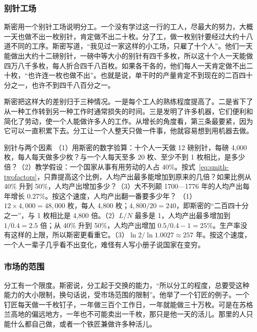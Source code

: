 \subsubsection{别针工场}
斯密用一个别针工场说明分工。一个没有学过这一行的工人，尽最大的努力，大概一天也做不出一枚别针，肯定做不出二十枚。分了工，做一枚别针要经过大约十八道不同的工序\cite{smith1776}。斯密写道，“我见过一家这样的小工场，只雇了十个人”。他们一天能做出大约十二磅别针，一磅中等大小的别针有四千多枚，所以这十个人一天能做四万八千多枚，每人折合四千八百枚。如果各干各的，他们每人一天肯定做不出二十枚，“也许连一枚也做不出”。也就是说，单干时的产量肯定不到现在的二百四十分之一，也许不到四千八百分之一\cite{smith1776}。

斯密把这样大的差别归于三种情况。一是每个工人的熟练程度提高了。二是省下了从一种工作转到另一种工作时通常损失的时间。三是发明了许多机器，它们便利和简化了劳动，使一个人能做许多人的工作\cite{smith1776}。从增长的角度看，第三条最要紧，因为它可以一直积累下去。分工让一个人整天只做一件事，他就容易想到用机器去做。

\begin{example}{别针与两个因素}\label{ex:smith-pins}
（1）用斯密的数字验算：十个人一天做 12 磅别针，每磅 4,000 枚，每人每天做多少枚？与一个人每天至多 20 枚、至少不到 1 枚相比，是多少倍？（2）教学假设：一个国家从事有用劳动的人占 40\%。按式~\eqref{eq:smith-twofactors}，只靠提高这个比例，人均产出最多能增加到原来的几倍？如果比例从 40\% 升到 50\%，人均产出增加多少？（3）大不列颠 1700—1776 年的人均产出每年增长 0.27\%。按这个速度，人均产出翻一番要多少年？
\solution （1）$12\times4{,}000=48{,}000$ 枚，每人 4,800 枚；$4{,}800/20=240$，即斯密的“二百四十分之一”，与 1 枚相比是 4,800 倍。（2）$L/N$ 最多是 1，人均产出最多增加到 $1/0.4=2.5$ 倍；从 40\% 升到 50\%，人均产出增加 $0.5/0.4-1=25\%$。生产率没有这样的上限，所以斯密更看重它。（3）$\ln2/\ln1.0027\approx257$ 年。按这个速度，一个人一辈子几乎看不出变化，难怪有人写小册子说国家在变穷。
\end{example}

\subsubsection{市场的范围}
分工有一个限度。斯密说，分工起于交换的能力，“所以分工的程度，总要受这种能力的大小限制，换句话说，受市场范围的限制”\cite{smith1776}。他举了一个钉匠的例子。一个钉匠每天做一千枚钉子，一年做三百个工作日，一年就能做三十万枚。可是在苏格兰高地的偏远地方，一年也不可能卖出一千枚，那只是他一天的活儿\cite{smith1776}。那里的人只能什么都自己做，或者一个铁匠兼做许多种活儿。

